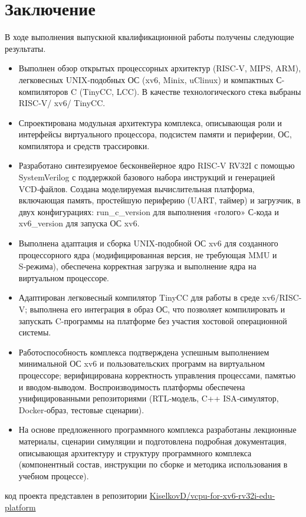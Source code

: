 

\section{Заключение}

  В ходе выполнения выпускной квалификационной работы получены следующие результаты.
  \begin{itemize}
    \item Выполнен обзор открытых процессорных архитектур (RISC‑V, MIPS, ARM), легковесных UNIX‑подобных ОС (xv6, Minix, uClinux) и компактных С-компиляторов C (TinyCC, LCC). В качестве технологического стека выбраны RISC‑V/ xv6/ TinyCC.
    \item Спроектирована модульная архитектура комплекса, описывающая роли и интерфейсы виртуального процессора, подсистем памяти и периферии, ОС, компилятора и средств трассировки.
    \item Разработано синтезируемое бесконвейерное ядро RISC‑V RV32I с помощью SystemVerilog с поддержкой базового набора инструкций и генерацией VCD‑файлов. Создана моделируемая вычислительная платформа, включающая память, простейшую периферию (UART, таймер) и загрузчик, в двух конфигурациях: run\_c\_version для выполнения «голого» С‑кода и xv6\_version для запуска ОС xv6.
    \item Выполнена адаптация и сборка UNIX‑подобной ОС xv6 для созданного процессорного ядра (модифицированная версия, не требующая MMU и S‑режима), обеспечена корректная загрузка и выполнение ядра на виртуальном процессоре.
    \item Адаптирован легковесный компилятор TinyCC для работы в среде xv6/RISC-V; выполнена его интеграция в образ ОС, что позволяет компилировать и запускать C-программы на платформе без участия хостовой операционной системы.
    \item Работоспособность комплекса подтверждена успешным выполнением минимальной ОС xv6 и пользовательских программ на виртуальном процессоре; верифицирована корректность управления процессами, памятью и вводом‑выводом. Воспроизводимость платформы обеспечена унифицированными репозиториями (RTL‑модель, C++ ISA‑симулятор, Docker‑образ, тестовые сценарии).
    \item На основе предложенного программного комплекса разработаны лекционные материалы, сценарии симуляции и подготовлена подробная документация, описывающая архитектуру и структуру программного комплекса (компонентный состав, инструкции по сборке и методика использования в учебном процессе).
  \end{itemize}
	код проекта представлен в репозитории \href{https://github.com/KiselkovD/vcpu-for-xv6-rv32i-edu-platform}{KiselkovD/vcpu-for-xv6-rv32i-edu-platform}